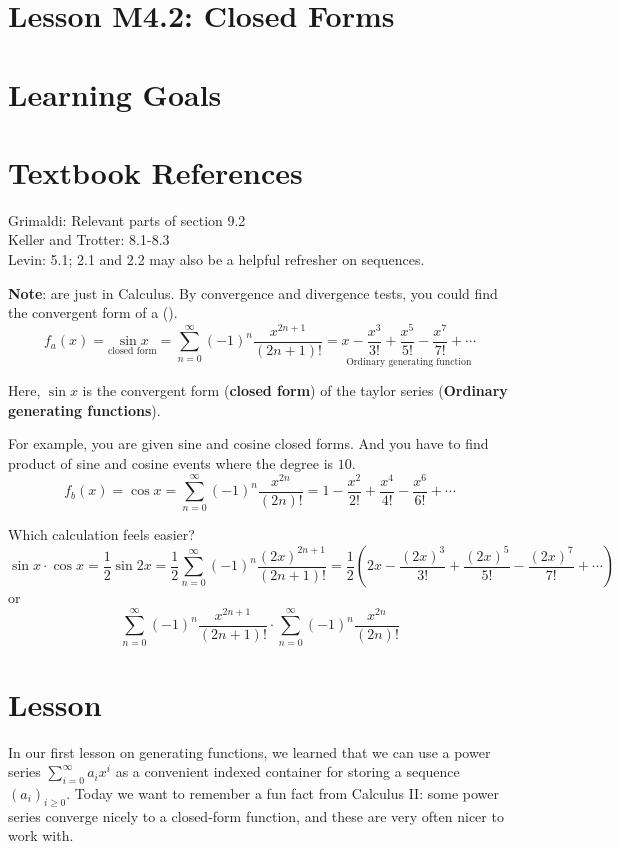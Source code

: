 \documentclass{article}
\theoremstyle{definition}
\begin{document}
\newpage



\section*{Lesson M4.2: Closed Forms}
\section*{Learning Goals}
\section*{Textbook References}
Grimaldi: Relevant parts of section 9.2\\
Keller and Trotter: 8.1-8.3\\
Levin: 5.1; 2.1 and 2.2 may also be a helpful refresher on sequences.


\textbf{Note}: 
 are just  in Calculus.
By convergence and divergence tests, you could find the convergent form of a  ().
$$
f_a(x)=\underset{\text{closed form}}{\sin{x}} = \sum_{n=0}^{\infty} (-1)^n \frac{x^{2n+1}}{(2n+1)!} = \underset{\text{Ordinary generating function}}{x - \frac{x^3}{3!} + \frac{x^5}{5!} - \frac{x^7}{7!} + \cdots}
$$


Here, $\sin{x}$ is the convergent form (\textbf{closed form}) of the taylor series (\textbf{Ordinary generating functions}).



For example, you are given sine and cosine closed forms. And you have to find
product of sine and cosine events where the degree is $10$.
$$
f_b(x)=\cos{x} = \sum_{n=0}^{\infty} (-1)^n \frac{x^{2n}}{(2n)!} = 1 - \frac{x^2}{2!} + \frac{x^4}{4!} - \frac{x^6}{6!} + \cdots
$$

Which calculation feels easier?
$$
\sin{x} \cdot \cos{x} = \frac{1}{2} \sin{2x} = \frac{1}{2} \sum_{n=0}^{\infty} (-1)^n \frac{(2x)^{2n+1}}{(2n+1)!} = \frac{1}{2} \left(2x - \frac{(2x)^3}{3!} + \frac{(2x)^5}{5!} - \frac{(2x)^7}{7!} + \cdots\right)
$$
or
$$
\sum_{n=0}^{\infty} (-1)^n \frac{x^{2n+1}}{(2n+1)!} \cdot \sum_{n=0}^{\infty} (-1)^n \frac{x^{2n}}{(2n)!}
$$











\section*{Lesson}
In our first lesson on generating functions, we learned that we can use a power series $\sum_{i=0}^{\infty} a_{i} x^{i}$ as a convenient indexed container for storing a sequence $\left(a_{i}\right)_{i \geq 0}$. Today we want to remember a fun fact from Calculus II: some power series converge nicely to a closed-form function, and these are very often nicer to work with.
\end{document}
